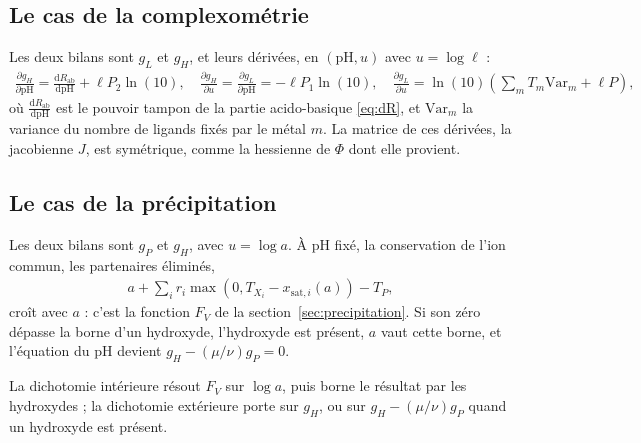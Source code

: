 \documentclass[a4paper,11pt]{article}
\newcommand\pH{\ensuremath{\mathrm{pH}}\xspace}
\newcommand\ddp[2]{\frac{\mathrm{d}#1}{\mathrm{d}#2}}
\newcommand\pdp[2]{\frac{\partial#1}{\partial#2}}
\newcommand\pare[1]{\left(#1\right)}
\begin{document}
\subsection{Le cas de la complexométrie}
Les deux bilans sont $g_L$ et $g_H$, et leurs dérivées, en $(\pH,u)$ avec $u=\log\ell$ :
\begin{align}
\pdp{g_H}\pH=\ddp{R_\text{ab}}\pH+\ell P_2\ln(10),\quad
\pdp{g_H}u=\pdp{g_L}\pH=-\ell P_1\ln(10),\quad
\pdp{g_L}u=\ln(10)\pare{\sum_mT_m\mathrm{Var}_m+\ell P},
\end{align}
où $\ddp{R_\text{ab}}\pH$ est le pouvoir tampon de la partie acido-basique \eqref{eq:dR}, et $\mathrm{Var}_m$ la variance du nombre de ligands fixés par le métal $m$.
La matrice de ces dérivées, la jacobienne $J$, est symétrique, comme la hessienne de $\Phi$ dont elle provient.

\subsection{Le cas de la précipitation}
Les deux bilans sont $g_P$ et $g_H$, avec $u=\log a$.
À \pH fixé, la conservation de l'ion commun, les partenaires éliminés,
\begin{align}
a+\sum_ir_i\max\pare{0,T_{X_i}-x_{\text{sat},i}(a)}-T_P,
\end{align}
croît avec $a$ : c'est la fonction $F_V$ de la section~\ref{sec:precipitation}.
Si son zéro dépasse la borne d'un hydroxyde, l'hydroxyde est présent, $a$ vaut cette borne, et l'équation du \pH devient $g_H-(\mu/\nu)g_P=0$.
\begin{algo}
La dichotomie intérieure résout $F_V$ sur $\log a$, puis borne le résultat par les hydroxydes ; la dichotomie extérieure porte sur $g_H$, ou sur $g_H-(\mu/\nu)g_P$ quand un hydroxyde est présent.
\end{algo}
\end{document}
